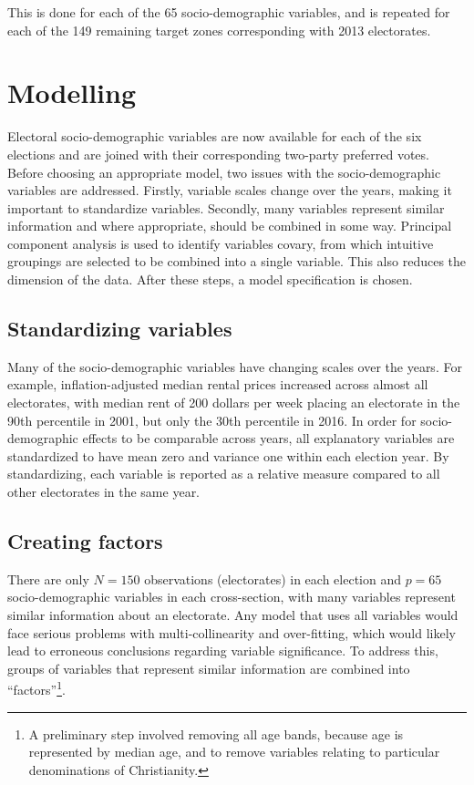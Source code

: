 \documentclass[11pt,a4paper,]{article}
\begin{document}
This is done for each of the 65 socio-demographic variables, and is repeated for each of the 149 remaining target zones corresponding with 2013 electorates.

\hypertarget{modelling}{%
\section{Modelling}\label{modelling}}

Electoral socio-demographic variables are now available for each of the six elections and are joined with their corresponding two-party preferred votes. Before choosing an appropriate model, two issues with the socio-demographic variables are addressed. Firstly, variable scales change over the years, making it important to standardize variables. Secondly, many variables represent similar information and where appropriate, should be combined in some way. Principal component analysis is used to identify variables covary, from which intuitive groupings are selected to be combined into a single variable. This also reduces the dimension of the data. After these steps, a model specification is chosen.

\hypertarget{standardizing-variables}{%
\subsection{Standardizing variables}\label{standardizing-variables}}

Many of the socio-demographic variables have changing scales over the years. For example, inflation-adjusted median rental prices increased across almost all electorates, with median rent of 200 dollars per week placing an electorate in the 90th percentile in 2001, but only the 30th percentile in 2016. In order for socio-demographic effects to be comparable across years, all explanatory variables are standardized to have mean zero and variance one within each election year. By standardizing, each variable is reported as a relative measure compared to all other electorates in the same year.

\hypertarget{creating-factors}{%
\subsection{Creating factors}\label{creating-factors}}

There are only \(N = 150\) observations (electorates) in each election and \(p = 65\) socio-demographic variables in each cross-section, with many variables represent similar information about an electorate. Any model that uses all variables would face serious problems with multi-collinearity and over-fitting, which would likely lead to erroneous conclusions regarding variable significance. To address this, groups of variables that represent similar information are combined into ``factors''\footnote{A preliminary step involved removing all age bands, because age is represented by median age, and to remove variables relating to particular denominations of Christianity.}.
\end{document}

